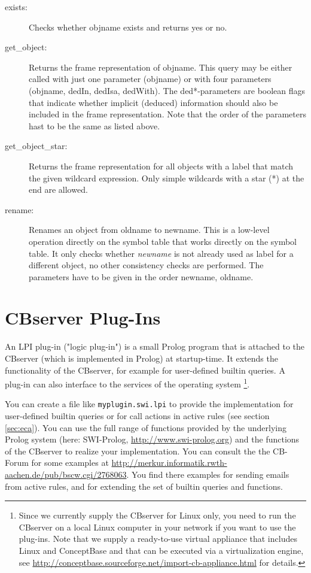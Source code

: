 \begin{description}
\item[exists:] Checks whether {\ttfamily objname} exists and returns {\ttfamily yes} or {\ttfamily no}.
\item[get\_object:] Returns the frame representation of {\ttfamily objname}. This
query may be either called with just one parameter ({\ttfamily objname}) or with
four parameters ({\ttfamily objname}, {\ttfamily dedIn}, {\ttfamily dedIsa}, {\ttfamily dedWith}).
The {\ttfamily ded*}-parameters are boolean flags that indicate whether
implicit (deduced) information should also be included in the frame representation.
Note that the order of the parameters hast to be the same as listed above.
\item[get\_object\_star:] Returns the frame representation for all objects with a label
that match the given wildcard expression. Only simple wildcards with a star (*) at the end
are allowed.
\item[rename:] Renames an object from {\ttfamily oldname} to {\ttfamily newname}.
This is a low-level operation directly on the symbol table that works directly
on the symbol table. It only checks whether {\em newname} is not already used as
label for a different object, no other consistency checks are performed.
The parameters have to be given in the order {\ttfamily newname}, {\ttfamily oldname}.
\end{description}


\chapter{CBserver Plug-Ins}
\label{cap:lpi}

An LPI plug-in ("logic plug-in") is a small Prolog program that is attached
to the CBserver (which is implemented in Prolog) at startup-time.
It extends the functionality of the CBserver, 
for example for user-defined builtin queries. A plug-in can also interface to
the services of the operating system%
\footnote{Since we currently supply the CBserver for Linux only, you need to run the CBserver
on a local Linux computer in your network if you want to use the plug-ins.
Note that we supply a ready-to-use
virtual appliance that includes Linux and ConceptBase and that can be executed
via a virtualization engine, see
\url{http://conceptbase.sourceforge.net/import-cb-appliance.html}
for details.}.


You can create a file like {\tt myplugin.swi.lpi} to provide the implementation 
for user-defined builtin queries or for call actions in 
active rules (see section \ref{sec:eca}). You can use the full range of functions
provided by the underlying Prolog system 
(here: SWI-Prolog, \url{http://www.swi-prolog.org}) and the functions of the CBserver to realize 
your implementation. You can consult the the CB-Forum for some examples at
\url{http://merkur.informatik.rwth-aachen.de/pub/bscw.cgi/2768063}.
You find there examples for sending emails 
from active rules, and for extending the set of builtin queries and functions.

